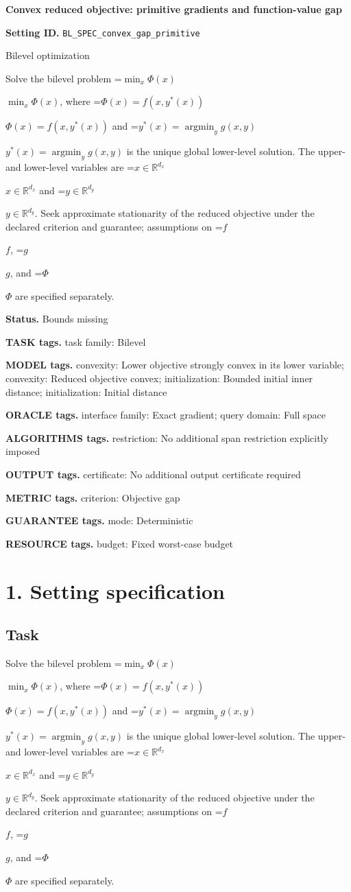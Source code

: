 \documentclass[10pt,a4paper]{article}
\newcommand{\AtlasMath}[1]{\par\begingroup\centering\setbox0=\hbox{$\displaystyle #1$}\ifdim\wd0>1.4\linewidth\typeout{ATLAS WIDE FORMULA: \the\wd0}\fi\ifdim\wd0>\linewidth\resizebox{\linewidth}{!}{\box0}\else\box0\fi\par\endgroup}
\newcommand{\AtlasInlineMath}[1]{\begingroup\setbox0=\hbox{$#1$}\ifdim\wd0>.4\linewidth\endgroup\AtlasMath{#1}\else\endgroup$#1$\fi}
\begin{document}
\raggedright

{\LARGE\bfseries\sffamily\color{AtlasNavy} Convex reduced objective: primitive gradients and function-value gap\par}\vspace{5pt}
\textbf{Setting ID.} \texttt{BL\_\allowbreak{}SPEC\_\allowbreak{}convex\_\allowbreak{}gap\_\allowbreak{}primitive}

Bilevel optimization

Solve the bilevel problem \AtlasInlineMath{\min_x\Phi(x)}, where \AtlasInlineMath{\Phi(x)=f(x,y^*(x))} and \AtlasInlineMath{y^*(x)=\operatorname*{argmin}_y g(x,y)} is the unique global lower-level solution. The upper- and lower-level variables are \AtlasInlineMath{x\in\mathbb{R}^{d_x}} and \AtlasInlineMath{y\in\mathbb{R}^{d_y}}. Seek approximate stationarity of the reduced objective under the declared criterion and guarantee; assumptions on \AtlasInlineMath{f}, \AtlasInlineMath{g}, and \AtlasInlineMath{\Phi} are specified separately.

\textbf{Status.} Bounds missing

\textbf{TASK tags.} task family: Bilevel

\textbf{MODEL tags.} convexity: Lower objective strongly convex in its lower variable; convexity: Reduced objective convex; initialization: Bounded initial inner distance; initialization: Initial distance

\textbf{ORACLE tags.} interface family: Exact gradient; query domain: Full space

\textbf{ALGORITHMS tags.} restriction: No additional span restriction explicitly imposed

\textbf{OUTPUT tags.} certificate: No additional output certificate required

\textbf{METRIC tags.} criterion: Objective gap

\textbf{GUARANTEE tags.} mode: Deterministic

\textbf{RESOURCE tags.} budget: Fixed worst-case budget

\section{1. Setting specification}
\subsection{Task}
Solve the bilevel problem \AtlasInlineMath{\min_x\Phi(x)}, where \AtlasInlineMath{\Phi(x)=f(x,y^*(x))} and \AtlasInlineMath{y^*(x)=\operatorname*{argmin}_y g(x,y)} is the unique global lower-level solution. The upper- and lower-level variables are \AtlasInlineMath{x\in\mathbb{R}^{d_x}} and \AtlasInlineMath{y\in\mathbb{R}^{d_y}}. Seek approximate stationarity of the reduced objective under the declared criterion and guarantee; assumptions on \AtlasInlineMath{f}, \AtlasInlineMath{g}, and \AtlasInlineMath{\Phi} are specified separately.
\end{document}
